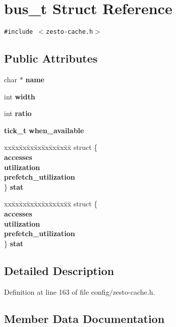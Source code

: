 \section{bus\_\-t Struct Reference}
\label{structbus__t}
{\tt \#include $<$zesto-cache.h$>$}

\subsection*{Public Attributes}
\begin{CompactItemize}
\item 
char $\ast$ {\bf name}
\item 
int {\bf width}
\item 
int {\bf ratio}
\item 
{\bf tick\_\-t} {\bf when\_\-available}
\item 
\begin{tabbing}
xx\=xx\=xx\=xx\=xx\=xx\=xx\=xx\=xx\=\kill
struct \{\\
 {\bf accesses}\\
 {\bf utilization}\\
 {\bf prefetch\_utilization}\\
\} {\bf stat}\\

\end{tabbing}\item 
\begin{tabbing}
xx\=xx\=xx\=xx\=xx\=xx\=xx\=xx\=xx\=\kill
struct \{\\
 {\bf accesses}\\
 {\bf utilization}\\
 {\bf prefetch\_utilization}\\
\} {\bf stat}\\

\end{tabbing}\end{CompactItemize}


\subsection{Detailed Description}


Definition at line 163 of file config/zesto-cache.h.

\subsection{Member Data Documentation}
